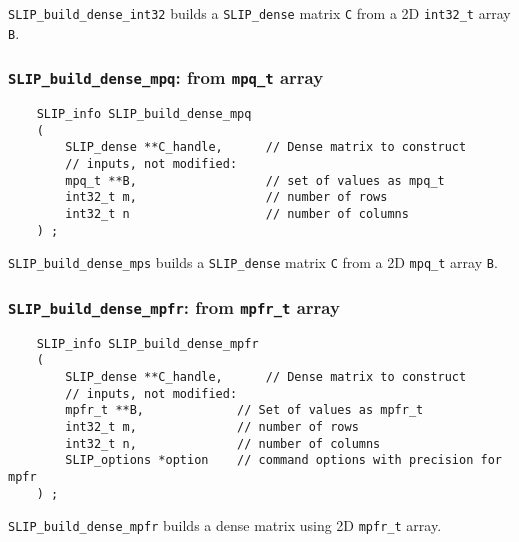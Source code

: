 \documentclass[12pt]{article}
\theoremstyle{definition}
\begin{document}
\verb|SLIP_build_dense_int32| builds a \verb'SLIP_dense' matrix \verb'C'
from a 2D \verb|int32_t| array \verb'B'.

\cprotect\subsubsection{\verb|SLIP_build_dense_mpq|: from \verb|mpq_t| array}
\label{s:user:build_dense_mpq}

\begin{mdframed}[userdefinedwidth=6in]
{\footnotesize
\begin{verbatim}
    SLIP_info SLIP_build_dense_mpq
    (
        SLIP_dense **C_handle,      // Dense matrix to construct
        // inputs, not modified:
        mpq_t **B,                  // set of values as mpq_t
        int32_t m,                  // number of rows
        int32_t n                   // number of columns
    ) ;
\end{verbatim}
} \end{mdframed}

\verb|SLIP_build_dense_mps| builds a \verb'SLIP_dense' matrix \verb'C'
from a 2D \verb|mpq_t| array \verb'B'.

\cprotect\subsubsection{\verb|SLIP_build_dense_mpfr|: from \verb|mpfr_t| array}
\label{s:user:build_dense_mpfr}

\begin{mdframed}[userdefinedwidth=6in]
{\footnotesize
\begin{verbatim}
    SLIP_info SLIP_build_dense_mpfr
    (
        SLIP_dense **C_handle,      // Dense matrix to construct
        // inputs, not modified:
        mpfr_t **B,             // Set of values as mpfr_t
        int32_t m,              // number of rows
        int32_t n,              // number of columns
        SLIP_options *option    // command options with precision for mpfr
    ) ;
\end{verbatim}
} \end{mdframed}

\verb|SLIP_build_dense_mpfr| builds a dense matrix using 2D \verb|mpfr_t|
array.
\end{document}

